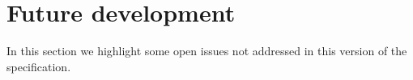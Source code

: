 
\section{Future development}
\label{future}

In this section we highlight some open issues not addressed in this version
of the \Render specification.
